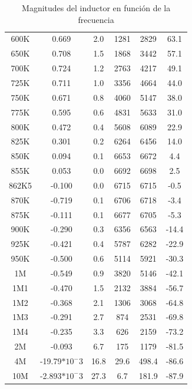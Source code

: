 \begin{center}
\begin{table}[H]
{\begin{tabular}{ c c c c c c }
				600K  & 0.669        & 2.0    & 1281 		& 2829  & 63.1   \\
				650K  & 0.708        & 1.5 		 & 1868 	& 3442  & 57.1    \\
				700K  & 0.724       & 1.2  		& 2763 		& 4217  & 49.1    \\
				725K  & 0.711        & 1.0  	  & 3356	 & 4664  & 44.0    \\
				750K  & 0.671       & 0.8 		 & 4060 	& 5147  & 38.0    \\
				775K  & 0.595       & 0.6 		 & 4831 	& 5633  & 31.0       \\
				800K  & 0.472       & 0.4 		 & 5608 	& 6089  & 22.9       \\
				825K  & 0.301       & 0.2  		& 6264 		& 6456  & 14.0       \\
				850K  & 0.094        & 0.1  	& 6653		& 6672  & 4.4        \\
				855K  & 0.053       & 0.0  		  & 6692	 & 6698  & 2.5        \\
				862K5 & -0.100         & 0.0    & 6715 		& 6715  & -0.5       \\
				870K  & -0.719       & 0.1 		 & 6706 	& 6718  & -3.4        \\
				875K  & -0.111      & 0.1  		& 6677 		& 6705  & -5.3       \\
				900K  & -0.290      & 0.3  		& 6356 		& 6563  & -14.4      \\
				925K  & -0.421      & 0.4 		 & 5787		 & 6282  & -22.9      \\
				950K  & -0.500         & 0.6  	& 5114 		& 5921  & -30.3       \\
				1M    & -0.549      & 0.9  		& 3820		 & 5146  & -42.1      \\
				1M1  & -0.470      & 1.5  		& 2132		 & 3884  & -56.7      \\
				1M2  & -0.368      & 2.1  		& 1306 		& 3068  & -64.8      \\
				1M3   & -0.291      & 2.7  		& 874  		& 2531  & -69.8      \\
				1M4  & -0.235      & 3.3 		 & 626  	& 2159  & -73.2     \\
				2M    & -0.093      & 6.7 		 & 175 		 & 1179  & -81.5       \\
				4M    & -19.79$*10^-3$  & 16.8 		& 29.6		 & 498.4 & -86.6     \\
				10M   & -2.893$*10^-3$ & 27.3 		& 6.7  		& 181.9 & -87.9     \\
            \hline 
        \end{tabular}
        }
        \caption{Magnitudes del inductor en función de la frecuencia}
        \label{table:Rta_en_frecuencia_inductor}
    \end{table}
\end{center}

